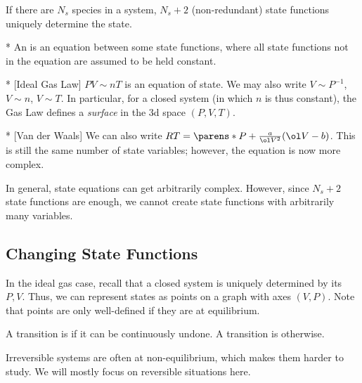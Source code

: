\begin{thm}
	If there are $N_s$ species in a system, $N_s+2$ (non-redundant) state functions uniquely determine the state.
\end{thm}

\begin{defn}*
	An  is an equation between some state functions, where all state functions not in the equation are assumed to be held constant.
\end{defn}

\begin{exm}*
	[Ideal Gas Law]
	$PV \sim nT$ is an equation of state. We may also write $V\sim P^{-1}$, $V\sim n$, $V\sim T$. In particular, for a closed system (in which $n$ is thus constant), the Gas Law defines a \emph{surface} in the 3d space $(P,V,T)$.
\end{exm}

\begin{exm}*
	[Van der Waals]
	We can also write $RT = \parens*{P + \frac a{\ol V^2}}(\ol V - b)$. This is still the same number of state variables; however, the equation is now more complex. 
\end{exm}

In general, state equations can get arbitrarily complex. However, since $N_s+2$ state functions are enough, we cannot create state functions with arbitrarily many variables.

\subsection{Changing State Functions}

In the ideal gas case, recall that a closed system is uniquely determined by its $P,V$. Thus, we can represent states as points on a graph with axes $(V,P)$. Note that points are only well-defined if they are at equilibrium.

\begin{defn}
	A transition is  if it can be continuously undone. A transition is  otherwise.
\end{defn}

Irreversible systems are often at non-equilibrium, which makes them harder to study. We will mostly focus on reversible situations here.
